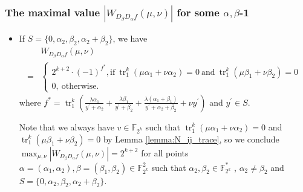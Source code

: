\documentclass[
    aspectratio=169,                   %
]{beamer}
\newcommand{\Fks}{\mathbb{F}_{2^k}^*}
\newcommand{\Fk}{\mathbb{F}_{2^k}}
\newcommand{\tr}{\operatorname{tr}_1^k}
\begin{document}
    \begin{frame}
        \frametitle{The maximal value $ |W_{D_{\beta}D_{\alpha}f}(\mu,\nu)| $ for some $ \alpha,\beta $-1}
    
        \begin{itemize}
            \item If $ S=\{0,\alpha_2,\beta_2,\alpha_2+\beta_2\} $, we have
            \begin{align*}
                &W_{D_{\beta}D_{\alpha}f}(\mu,\nu)\\
                =&\begin{cases}
                    2^{k+2}\cdot(-1)^{f^*},\text{if}~\tr\left(\mu\alpha_1+\nu\alpha_2\right)=0 ~
                    \text{and}~\tr\left(\mu\beta_1+\nu\beta_2\right)=0 \\
                    0,~\text{otherwise.}
                \end{cases}
            \end{align*}
            where $ f^* = \tr\left(\frac{\lambda\alpha_1}{y^{\prime}+\alpha_2}+\frac{\lambda\beta_1}{y^{\prime}+\beta_2}+\frac{\lambda(\alpha_1+\beta_1)}{y^{\prime}+\alpha_2+\beta_2}+\nu y^{\prime}\right) $ and $ y^{\prime}\in S $.
            
            Note that we always have $ v\in\Fk $ such that $ \tr\left(\mu\alpha_1+\nu\alpha_2\right)=0 $ 
            and $\tr\left(\mu\beta_1+\nu\beta_2\right)=0 $ by Lemma \ref{lemma:N_ij_trace}, 
            so we conclude $ \max_{\mu,\nu}|W_{D_{\beta}D_{\alpha}f}(\mu,\nu)|= 2^{k+2} $
            for all points $ \alpha=(\alpha_1,\alpha_2),\beta=(\beta_1,\beta_2)\in\Fk^2 $ such that $ \alpha_2,\beta_2\in\Fks $ 
            , $ \alpha_2\ne\beta_2 $ and $ S=\{0,\alpha_2,\beta_2,\alpha_2+\beta_2\} $. 
        \end{itemize}
    
    \end{frame}
\end{document}
